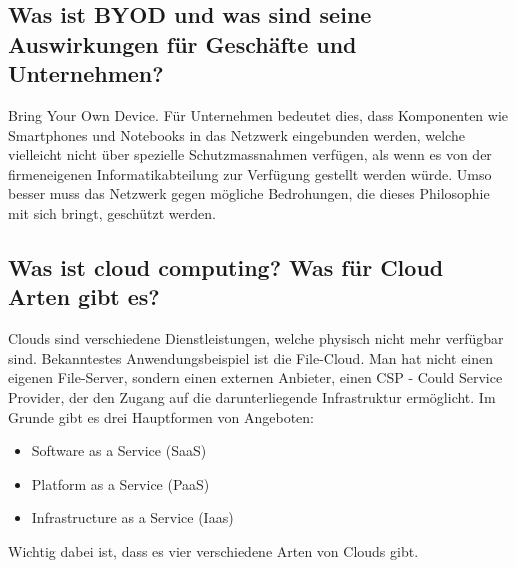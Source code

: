 \subsection*{Was ist \flqq BYOD\frqq{} und was sind seine Auswirkungen für Geschäfte und Unternehmen?}
Bring Your Own Device. Für Unternehmen bedeutet dies, dass Komponenten wie Smartphones und Notebooks in das Netzwerk eingebunden werden, welche vielleicht nicht über spezielle Schutzmassnahmen verfügen, als wenn es von der firmeneigenen Informatikabteilung zur Verfügung gestellt werden würde. Umso besser muss das Netzwerk gegen mögliche Bedrohungen, die dieses Philosophie mit sich bringt, geschützt werden.

\subsection*{Was ist \flqq cloud computing\frqq{}? Was für Cloud Arten gibt es?}
Clouds sind verschiedene Dienstleistungen, welche physisch nicht mehr verfügbar sind. Bekanntestes Anwendungsbeispiel ist die File-Cloud. Man hat nicht einen eigenen File-Server, sondern einen externen Anbieter, einen CSP - Could Service Provider, der den Zugang auf die darunterliegende Infrastruktur ermöglicht. Im Grunde gibt es drei Hauptformen von Angeboten:
\begin{itemize}
    \item Software as a Service (SaaS)
    \item Platform as a Service (PaaS)
    \item Infrastructure as a Service (Iaas)
\end{itemize}
Wichtig dabei ist, dass es vier verschiedene Arten von Clouds gibt.
